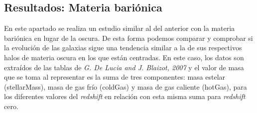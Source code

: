 \begin{comment}
La figura \textit{Figura}~\ref{fig:fig4} presenta el promedio de las masas de los halos para los cinco intervalos de masa de la \textit{Tabla}~\ref{tab:tabla2}. Esta gráfica, refleja un cambio porcentual respecto al estado final a \textit{redshift} cero. Por tanto, para un \textit{redhift} dado se ve que un cierto halo ha ganado o perdido un cierto porcentaje de su masa final. Cabe esperar que para \textit{redshift} cercanos al 0, su cambio porcentual sea muy pequeño, es decir, converja al estado final de manera suave. El halo ha llegado a una etapa estable y definida. Si ahora se implementa el concepto de desviación típica con muchos halos con los que promediar, ésta sera mínima para esta etapa final y máxima para el estado inicial. Esto se debe a que cada halo parte con comportamientos másicos muy distintos. Si se observa alguna desviación nula comprendida entre dos momentos de desviacin alta a \textit{redshift} altos, esto se debe a que únicamente un halo con el que se ha promediado llega a ese \textit{redhisft}. No quiere decir, por tanto, que todos los halos converjan en ese punto, si no que solo hay uno. \\

Es decir, se interpreta la desviación como la diferencia máxima entre un cambio porcentual de un halo respecto a otro para un \textit{redshift} determinado. Conforme mayor sea la desviación, más distintos son los comportamientos. Los halos ganan o pierden masa de una manera más arbitraria. Si es materia negra, esto se debe a un intercambio por interacción gravitatoria. Ahota bien, si la desviación se reduce, los halos cambian de manera similar. Son más estables, tendrán menos interacciones. \\

De esta manera, se interpretan mejor las gráficas, resaltando la mala resolución que se produce en los halos de baja masa, cuya desviación es grande de manera continuada. 
\end{comment}

\subsection{Resultados: Materia bariónica}
\label{subsec:2_C}

En este apartado se realiza un estudio similar al del anterior con la materia bariónica en lugar de la oscura. De esta forma podemos comparar y comprobar si la evolución de las galaxias sigue una tendencia similar a la de sus respectivos halos de materia oscura en los que están centradas. En este caso, los datos son extraídos de las tablas de \textit{G. De Lucia and J. Blaizot, 2007} \cite{2} y el valor de masa que se toma al representar es la suma de tres componentes: masa estelar (stellarMass), masa de gas frío (coldGas) y masa de gas caliente (hotGas), para los diferentes valores del \textit{redshift} en relación con esta misma suma para \textit{redshift} cero. \\

